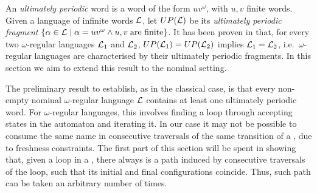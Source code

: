 %
%
%
An \emph{ultimately periodic} word is a word of the form $uv^\omega$, with $u,v$ finite words. Given a language of infinite words $\mathcal{L}$, let $UP(\mathcal{L})$ be its \emph{ultimately periodic fragment} $\{ \alpha \in \mathcal{L} \mid \alpha = uv^\omega \land u,v \; \text{are finite} \}$. It has been proven in \cite{CalbrixNP93,Buchi62} that, for every two $\omega$-regular languages $\mathcal{L}_1$ and $\mathcal{L}_2$, $UP(\mathcal{L}_1) = UP(\mathcal{L}_2)$ implies $\mathcal{L}_1 = \mathcal{L}_2$, i.e.\ $\omega$-regular languages are characterised by their ultimately periodic fragments.
In this section we aim to extend this result to the nominal setting. 

The preliminary result to establish, as in the classical case, is that every non-empty nominal $\omega$-regular language $\mathcal{L}$ contains at least one ultimately periodic word. For $\omega$-regular languages, this involves finding a loop through accepting states in the automaton and iterating it. In our case it may not be possible to consume the same name in consecutive traversals of the same transition of a \hdma, due to freshness constraints. The first part of this section will be spent in showing that, given a loop in a \hdma{}, there always is a path induced by consecutive traversals of the loop, such that its initial and final configurations coincide. Thus, such path can be taken an arbitrary number of times.

